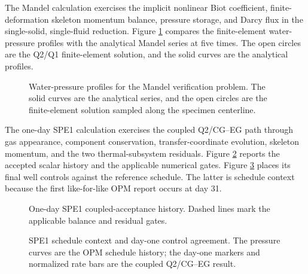 The Mandel calculation exercises the implicit nonlinear Biot coefficient,
finite-deformation skeleton momentum balance, pressure storage, and Darcy flux
in the single-solid, single-fluid reduction.  Figure
\ref{fig:mandel_pressure_profiles} compares the finite-element water-pressure
profiles with the analytical Mandel series at five times.  The open circles are
the Q2/Q1 finite-element solution, and the solid curves are the analytical
profiles.

\begin{figure}[ht]
	\centering
	\resizebox{\textwidth}{!}{%
	}
	\caption{Water-pressure profiles for the Mandel verification problem.  The
		solid curves are the analytical series, and the open circles are the
		finite-element solution sampled along the specimen centerline.}
	\label{fig:mandel_pressure_profiles}
\end{figure}

The one-day SPE1 calculation exercises the coupled Q2/CG--EG path through gas
appearance, component conservation, transfer-coordinate evolution, skeleton
momentum, and the two thermal-subsystem residuals.  Figure
\ref{fig:spe1_one_day_acceptance_history} reports the accepted scalar history
and the applicable numerical gates.  Figure
\ref{fig:spe1_one_day_opm_context} places its final well controls against the
reference schedule.  The latter is schedule context because the first
like-for-like OPM report occurs at day 31.

\begin{figure}[ht]
	\centering
	\resizebox{\textwidth}{!}{%
	}
	\caption{One-day SPE1 coupled-acceptance history.  Dashed lines mark the
		applicable balance and residual gates.}
	\label{fig:spe1_one_day_acceptance_history}
\end{figure}

\begin{figure}[ht]
	\centering
	\resizebox{\textwidth}{!}{%
	}
	\caption{SPE1 schedule context and day-one control agreement.  The pressure
		curves are the OPM schedule history; the day-one markers and normalized
		rate bars are the coupled Q2/CG--EG result.}
	\label{fig:spe1_one_day_opm_context}
\end{figure}

\FloatBarrier
